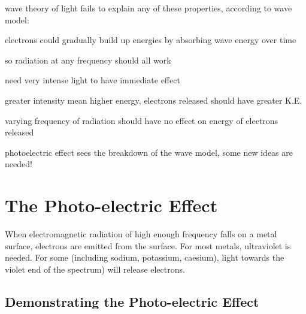 \documentclass[a4paper,12pt]{book}
\newcommand{\cmt}{}
\newcommand{\cmt}{}
\begin{document}
\cmt wave theory of light fails to explain any of these properties, according to wave model:

\begin{compactitem}
	
	\item[--] electrons could gradually build up energies by absorbing wave energy over time
	
	so radiation at any frequency should all work 
	
	
	\item[--] need very intense light to have immediate effect
	
	\item[--] greater intensity mean higher energy, electrons released should have greater K.E.
	
	\item[--] varying frequency of radiation should have no effect on energy of electrons released
\end{compactitem}

photoelectric effect sees the breakdown of the wave model, some new ideas are needed!

\newpage
\section{The Photo-electric Effect}
When electromagnetic radiation of high enough frequency falls on a metal surface, electrons are emitted from the surface.
For most metals, ultraviolet is needed. For some (including sodium, potassium, caesium), light towards the violet end of the spectrum) will release electrons.

 
\subsection{Demonstrating the Photo-electric Effect}
\end{document}

